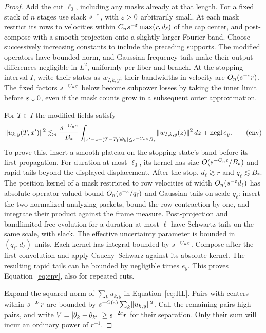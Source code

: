 \begin{proof}
Add the cut $\ell_0$, including any masks already at that length. For a
fixed stack of $n$ stages use slack $s^{-\varepsilon}$, with $\varepsilon>0$
arbitrarily small. At each mask restrict its rows to velocities within
$C_ns^{-\varepsilon}\max(r,d_\ell)$ of the cap center, and post-compose with
a smooth projection onto a slightly larger Fourier band. Choose
successively increasing constants to include the preceding supports.
The modified operators have bounded norm, and Gaussian frequency tails
make their output differences negligible in $L^2$, uniformly per
fiber and branch. At the stopping interval $I$, write their states as
$w_{I,k,y}$; their bandwidths in velocity are $O_n(s^{-\varepsilon}r)$.
The fixed factors $s^{-C_n\varepsilon}$ below become subpower losses by taking
the inner limit before $\varepsilon\downarrow0$, even if the mask counts grow
in a subsequent outer approximation.

For $T\in I$ the modified fields satisfy
\begin{equation}
 \lVert u_{k,y}(T,x')\rVert^2
 \lesssim_n\frac{s^{-C_n\varepsilon}}{B_*}
 \int_{|x'-z-(T-T_I)\theta_k|\leq s^{-C_n\varepsilon}B_*}
             \lVert w_{I,k,y}(z)\rVert^2\,dz
 +\mathrm{negl}\,e_y.
 \tag{env}\label{eq:env}
\end{equation}
To prove this, insert a smooth plateau on the stopping state's band
before its first propagation. For duration at most $\ell_0$, its
kernel has size $O(s^{-C_n\varepsilon}/B_*)$ and rapid tails beyond the
displayed displacement. After the stop, $d_\ell\gtrsim r$ and
$q_\ell\lesssim B_*$. The position kernel of a mask restricted to row
velocities of width $O_n(s^{-\varepsilon}d_\ell)$ has absolute operator-valued
bound $O_n(s^{-\varepsilon}/q_\ell)$ and Gaussian tails on scale $q_\ell$:
insert the two normalized analyzing packets, bound the row contraction
by one, and integrate their product against the frame measure.
Post-projection and bandlimited free evolution for a duration at most
$\ell$ have Schwartz tails on the same scale, with slack. The effective
uncertainty parameter is bounded in $(q_\ell,d_\ell)$ units. Each
kernel has integral bounded by $s^{-C_n\varepsilon}$. Compose after the first
convolution and apply Cauchy--Schwarz against its absolute kernel.
The resulting rapid tails can be bounded by negligible times $e_y$.
This proves Equation~\eqref{eq:env}, also for repeated cuts.

Expand the squared norm of $\sum_ku_{k,y}$ in
Equation~\eqref{eq:HL}. Pairs with centers within $s^{-2\varepsilon}r$
are bounded by $s^{-O(\varepsilon)}\sum_k\lVert u_{k,y}\rVert^2$.
Call the remaining pairs high pairs, and write
$V=|\theta_k-\theta_{k'}|\geq s^{-2\varepsilon}r$ for their separation.
Only their sum will incur an ordinary power of $r^{-1}$.


\end{proof}
